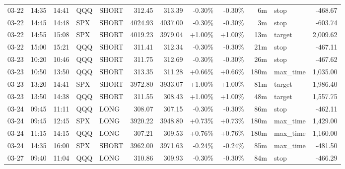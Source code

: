 \documentclass[11pt,a4paper,twoside]{article}
\begin{document}
\begin{center}
\begin{longtable}{>{\color{txtmain}}l l l l l r r r r r >{\color{txtmain}}l r}
03-22 & 14:35 & 14:41 & QQQ & SHORT & 312.45 & 313.39 & \textcolor{lossred}{-0.30\%} & \textcolor{lossred}{-0.30\%} & 6m & stop & \textcolor{lossred}{-468.67} \\
03-22 & 14:45 & 14:48 & SPX & SHORT & 4024.93 & 4037.00 & \textcolor{lossred}{-0.30\%} & \textcolor{lossred}{-0.30\%} & 3m & stop & \textcolor{lossred}{-603.74} \\
03-22 & 14:55 & 15:08 & SPX & SHORT & 4019.23 & 3979.04 & \textcolor{wingreen}{+1.00\%} & \textcolor{wingreen}{+1.00\%} & 13m & target & \textcolor{wingreen}{2,009.62} \\
03-22 & 15:00 & 15:21 & QQQ & SHORT & 311.41 & 312.34 & \textcolor{lossred}{-0.30\%} & \textcolor{lossred}{-0.30\%} & 21m & stop & \textcolor{lossred}{-467.11} \\
03-23 & 10:20 & 10:46 & QQQ & SHORT & 311.75 & 312.69 & \textcolor{lossred}{-0.30\%} & \textcolor{lossred}{-0.30\%} & 26m & stop & \textcolor{lossred}{-467.62} \\
03-23 & 10:50 & 13:50 & QQQ & SHORT & 313.35 & 311.28 & \textcolor{wingreen}{+0.66\%} & \textcolor{wingreen}{+0.66\%} & 180m & max\_time & \textcolor{wingreen}{1,035.00} \\
03-23 & 13:20 & 14:41 & SPX & SHORT & 3972.80 & 3933.07 & \textcolor{wingreen}{+1.00\%} & \textcolor{wingreen}{+1.00\%} & 81m & target & \textcolor{wingreen}{1,986.40} \\
03-23 & 13:50 & 14:38 & QQQ & SHORT & 311.55 & 308.43 & \textcolor{wingreen}{+1.00\%} & \textcolor{wingreen}{+1.00\%} & 48m & target & \textcolor{wingreen}{1,557.75} \\
03-24 & 09:45 & 11:11 & QQQ & LONG & 308.07 & 307.15 & \textcolor{lossred}{-0.30\%} & \textcolor{lossred}{-0.30\%} & 86m & stop & \textcolor{lossred}{-462.11} \\
03-24 & 09:45 & 12:45 & SPX & LONG & 3920.22 & 3948.80 & \textcolor{wingreen}{+0.73\%} & \textcolor{wingreen}{+0.73\%} & 180m & max\_time & \textcolor{wingreen}{1,429.00} \\
03-24 & 11:15 & 14:15 & QQQ & LONG & 307.21 & 309.53 & \textcolor{wingreen}{+0.76\%} & \textcolor{wingreen}{+0.76\%} & 180m & max\_time & \textcolor{wingreen}{1,160.00} \\
03-24 & 14:35 & 16:00 & SPX & SHORT & 3962.00 & 3971.63 & \textcolor{lossred}{-0.24\%} & \textcolor{lossred}{-0.24\%} & 85m & max\_time & \textcolor{lossred}{-481.50} \\
03-27 & 09:40 & 11:04 & QQQ & LONG & 310.86 & 309.93 & \textcolor{lossred}{-0.30\%} & \textcolor{lossred}{-0.30\%} & 84m & stop & \textcolor{lossred}{-466.29} \\

\end{longtable}
\end{center}
\end{document}
